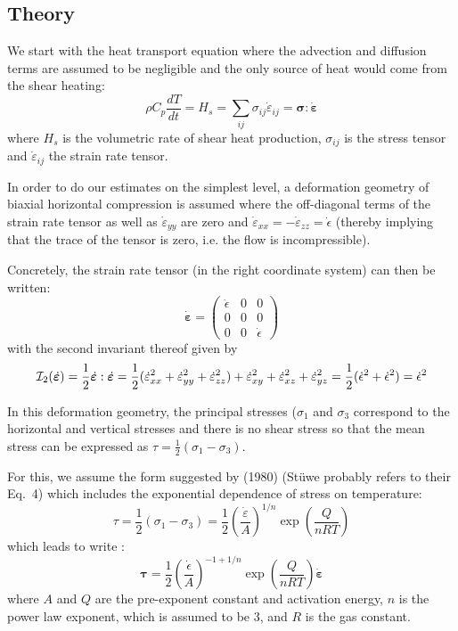 \subsection*{Theory}

We start with the heat transport equation where the advection and diffusion terms 
are assumed to be negligible and the only source of heat would come from the shear heating:
\[
\rho C_p \frac{dT}{dt} = H_s = \sum_{ij}\sigma_{ij} \dot{\varepsilon}_{ij} = 
{\bm \sigma} : \dot{\bm \varepsilon}
\]
where $H_s$ is the volumetric rate of shear heat production, 
$\sigma_{ij}$ is the stress tensor and  $\dot{\varepsilon}_{ij}$ the strain rate tensor.

In order to do our estimates on the simplest level, a deformation
geometry of biaxial horizontal compression is assumed where the off-diagonal terms of the strain rate
tensor as well as $\dot{\varepsilon}_{yy}$ are zero and $\dot{\varepsilon}_{xx}=-\dot{\varepsilon}_{zz}
=\dot{\epsilon}$ (thereby implying that the trace of the tensor is zero, i.e. the flow
is incompressible).

Concretely, the strain rate tensor (in the right coordinate system) can then be written:
\[
\dot{\bm \varepsilon} = 
\left(
\begin{array}{ccc}
\dot\epsilon &0 & 0 \\
0 &0 & 0 \\
0 & 0 & \dot\epsilon
\end{array}
\right)
\]
with the second invariant thereof given by
\[
{\cal I}_2(\dot{\bm \varepsilon}) 
= \frac12 \dot{\bm \varepsilon}:\dot{\bm \varepsilon}
= \frac12 (
\dot\varepsilon^2_{xx} + \dot\varepsilon^2_{yy} + \dot\varepsilon^2_{zz}
)+ 
\dot\varepsilon^2_{xy} + \dot\varepsilon^2_{xz} + \dot\varepsilon^2_{yz}
=\frac12 ( \dot\epsilon^2 + \dot\epsilon^2)
= \dot\epsilon^2
\]

In this deformation geometry, the principal stresses ($\sigma_1$ and $\sigma_3$ correspond 
to the horizontal and vertical stresses and there is no shear stress so that 
the mean stress can be expressed as $\tau = \frac12(\sigma_1-\sigma_3)$.

For this, we assume the form suggested by \textcite{brko80} (1980) 
(St\"uwe probably refers to their Eq.~4)
which includes the exponential dependence of stress on temperature:
\[
\tau = \frac{1}{2} (\sigma_1-\sigma_3) = \frac12 \left(\frac{\dot\varepsilon}{A} \right)^{1/n}
\exp \left( \frac{Q}{nRT} \right)
\]
which leads to write :
\[
{\bm \tau} = \frac12 \left(\frac{\dot\epsilon}{A} \right)^{-1+1/n}
\exp \left(\frac{Q}{nRT} \right) \dot{\bm \varepsilon}
\]
where $A$ and $Q$ are the pre-exponent constant and activation energy, $n$ is the power law exponent, 
which is assumed to be 3, and $R$ is the gas constant.

